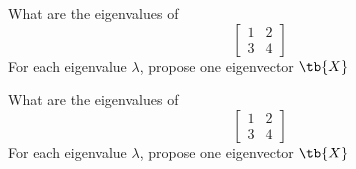 \bexo
What are the eigenvalues of 
\begin{equation*}
\left[
\begin{array}{cc}
1 & 2 \\
3 & 4
\end{array}
\right]
\end{equation*}
For each eigenvalue $\lambda$, propose one eigenvector $\tb{X}$
\eexo{}

\bexo
What are the eigenvalues of 
\begin{equation*}
\left[
\begin{array}{cc}
1 & 2 \\
3 & 4
\end{array}
\right]
\end{equation*}
For each eigenvalue $\lambda$, propose one eigenvector $\tb{X}$
\eexo{}


